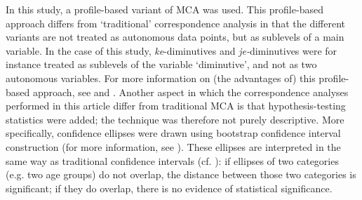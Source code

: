 \documentclass[output=paper]{LSP/langsci}
\begin{document}
In this study, a profile-based variant of MCA was used. This profile-based approach differs from ‘traditional’ correspondence analysis in that the different variants are not treated as autonomous data points, but as sublevels of a main variable. In the case of this study, \textit{ke}{}-diminutives and \textit{je-}diminutives were for instance treated as sublevels of the variable ‘diminutive’, and not as two autonomous variables. For more information on (the advantages of) this profile-based approach, see \citet{de_sutter_lexical_2012} and \citet{speelman_profile-based_2003}. Another aspect in which the correspondence analyses performed in this article differ from traditional MCA is that hypothesis-testing statistics were added; the technique was therefore not purely descriptive. More specifically, confidence ellipses were drawn using bootstrap confidence interval construction (for more information, see \citealt{plevoets_status_2013}). These ellipses are interpreted in the same way as traditional confidence intervals (cf. \citealt{plevoets_status_2013}): if ellipses of two categories (e.g. two age groups) do not overlap, the distance between those two categories is significant; if they do overlap, there is no evidence of statistical significance.
\end{document}
